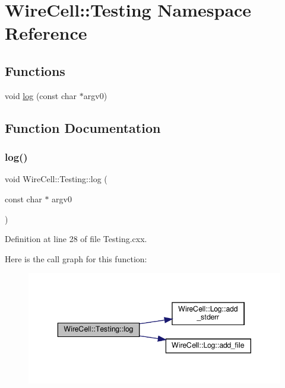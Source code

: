 \hypertarget{namespace_wire_cell_1_1_testing}{}\section{Wire\+Cell\+:\+:Testing Namespace Reference}
\label{namespace_wire_cell_1_1_testing}
\subsection*{Functions}
\begin{DoxyCompactItemize}
\item 
void \hyperlink{namespace_wire_cell_1_1_testing_a97bdfc866696085d364890201df40bd1}{log} (const char $\ast$argv0)
\end{DoxyCompactItemize}


\subsection{Function Documentation}
\mbox{\label{namespace_wire_cell_1_1_testing_a97bdfc866696085d364890201df40bd1}} 
\subsubsection{\texorpdfstring{log()}{log()}}
{\footnotesize\ttfamily void Wire\+Cell\+::\+Testing\+::log (\begin{DoxyParamCaption}\item[{const char $\ast$}]{argv0 }\end{DoxyParamCaption})}



Definition at line 28 of file Testing.\+cxx.

Here is the call graph for this function\+:
\nopagebreak
\begin{figure}[H]
\begin{center}
\leavevmode
\includegraphics[width=343pt]{namespace_wire_cell_1_1_testing_a97bdfc866696085d364890201df40bd1_cgraph}
\end{center}
\end{figure}
